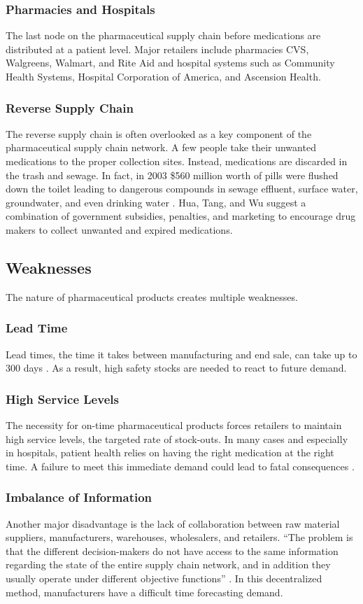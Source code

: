 \documentclass[sigconf]{acmart}
\begin{document}
\subsubsection{Pharmacies and Hospitals} The last node on the pharmaceutical supply chain before medications are distributed at a patient level. Major retailers include pharmacies CVS, Walgreens, Walmart, and Rite Aid and hospital systems such as Community Health Systems, Hospital Corporation of America, and Ascension Health. 
\subsubsection{Reverse Supply Chain} The reverse supply chain is often overlooked as a key component of the pharmaceutical supply chain network. A few people take their unwanted medications to the proper collection sites. Instead, medications are discarded in the trash and sewage. In fact, in 2003 \$560 million worth of pills were flushed down the toilet leading to dangerous compounds in sewage effluent, surface water, groundwater, and even drinking water \cite{Hua01}. Hua, Tang, and Wu \cite{Hua01} suggest a combination of government subsidies, penalties, and marketing to encourage drug makers to collect unwanted and expired medications. 

\subsection{Weaknesses}
The nature of pharmaceutical products creates multiple weaknesses. 
\subsubsection{Lead Time} Lead times, the time it takes between manufacturing and end sale, can take up to 300 days \cite{Shah01}. As a result, high safety stocks are needed to react to future demand.
\subsubsection{High Service Levels} The necessity for on-time pharmaceutical products forces retailers to maintain high service levels, the targeted rate of stock-outs. In many cases and especially in hospitals, patient health relies on having the right medication at the right time. A failure to meet this immediate demand could lead to fatal consequences \cite{Kelle01} \cite{Hua01}.
\subsubsection{Imbalance of Information} Another major disadvantage is the lack of collaboration between raw material suppliers, manufacturers, warehouses, wholesalers, and retailers. ``The problem is that the different decision-makers do not have access to the same information regarding the state of the entire supply chain network, and in addition they usually operate under different objective functions'' \cite{Sahay01}. In this decentralized method, manufacturers have a difficult time forecasting demand. 
\end{document}
